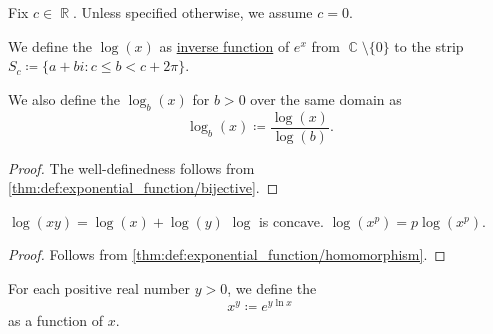 \begin{definition}\label{def:logarithm}
  Fix \( c \in \BbbR \). Unless specified otherwise, we assume \( c = 0 \).

  We define the  \( \log(x) \) as \hyperref[def:set_valued_function/inverse]{inverse function} of \( e^x \) from \( \BbbC \setminus \{ 0 \} \) to the strip \( S_c \coloneqq \{ a + bi \colon c \leq b < c + 2\pi \} \).

  We also define the  \( \log_b(x) \) for \( b > 0 \) over the same domain as
  \begin{equation*}
    \log_b(x) \coloneqq \frac {\log(x)} {\log(b)}.
  \end{equation*}
\end{definition}
\begin{proof}
  The well-definedness follows from \cref{thm:def:exponential_function/bijective}.
\end{proof}

\begin{proposition}\label{thm:def:logarithm}
  \hfill
  \begin{thmenum}
     \( \log(xy) = \log(x) + \log(y) \)
     \( \log \) is concave.
     \( \log(x^p) = p \log(x^p) \).
  \end{thmenum}
\end{proposition}
\begin{proof}
   Follows from \cref{thm:def:exponential_function/homomorphism}.
\end{proof}

\begin{definition}\label{def:power_function}
  For each positive real number \( y > 0 \), we define the 
  \begin{equation*}
    x^y \coloneqq e^{y \ln x}
  \end{equation*}
  as a function of \( x \).
\end{definition}

